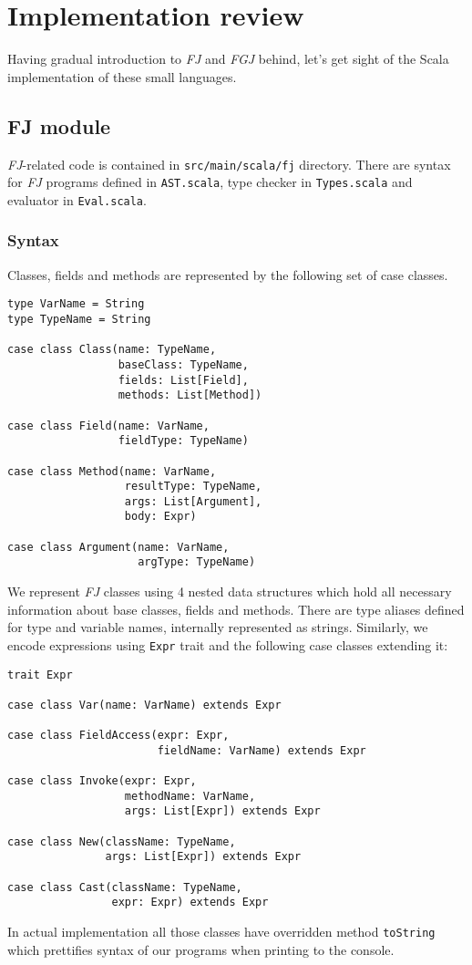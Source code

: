 \documentclass{article}[12pt]
\begin{document}
\section{Implementation review}

Having gradual introduction to \emph{FJ} and \emph{FGJ} behind,
let's get sight of the Scala implementation of these small languages.

\subsection{FJ module}

\emph{FJ}-related code is contained in \texttt{src/main/scala/fj}
directory. There are syntax for \emph{FJ} programs defined in
\texttt{AST.scala}, type checker in \texttt{Types.scala} and
evaluator in \texttt{Eval.scala}.

\subsubsection{Syntax}

Classes, fields and methods are represented by the following set of
case classes.

\begin{verbatim}
type VarName = String
type TypeName = String

case class Class(name: TypeName,
                 baseClass: TypeName,
                 fields: List[Field],
                 methods: List[Method])

case class Field(name: VarName,
                 fieldType: TypeName)

case class Method(name: VarName,
                  resultType: TypeName,
                  args: List[Argument],
                  body: Expr)

case class Argument(name: VarName,
                    argType: TypeName)
\end{verbatim}
We represent \emph{FJ} classes using 4 nested data structures
which hold all necessary information about base classes, fields
and methods. There are type aliases defined for type and variable
names, internally represented as strings. Similarly, we encode
expressions using \texttt{Expr} trait and the following case classes
extending it:

\begin{verbatim}
trait Expr

case class Var(name: VarName) extends Expr

case class FieldAccess(expr: Expr,
                       fieldName: VarName) extends Expr

case class Invoke(expr: Expr,
                  methodName: VarName,
                  args: List[Expr]) extends Expr

case class New(className: TypeName,
               args: List[Expr]) extends Expr

case class Cast(className: TypeName,
                expr: Expr) extends Expr
\end{verbatim}
In actual implementation all those classes have overridden
method \texttt{toString} which prettifies syntax of our
programs when printing to the console.
\end{document}
